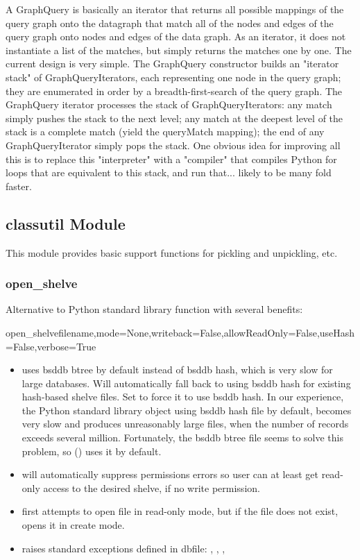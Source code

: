 \documentclass{howto}
\begin{document}
A GraphQuery is basically an iterator that returns all possible mappings of the query graph onto the datagraph that match all of the nodes and edges of the query graph onto nodes and edges of the data graph.  As an iterator, it does not instantiate a list of the matches, but simply returns the matches one by one.  The current design is very simple.  The GraphQuery constructor builds an "iterator stack" of GraphQueryIterators, each representing one node in the query graph; they are enumerated in order by a breadth-first-search of the query graph.  The GraphQuery iterator processes the stack of GraphQueryIterators: any match simply pushes the stack to the next level; any match at the deepest level of the stack is a complete match (yield the queryMatch mapping); the end of any GraphQueryIterator simply pops the stack.  One obvious idea for improving all this is to replace this "interpreter" with a "compiler" that compiles Python for loops that are equivalent to this stack, and run that... likely to be many fold faster.




\subsection{classutil Module}
\label{classutil-module}
This module provides basic support functions for pickling and unpickling,
etc.

\subsubsection{open_shelve}
Alternative to Python standard library function  with several benefits:
\begin{funcdesc}{open_shelve}{filename,mode=None,writeback=False,allowReadOnly=False,useHash=False,verbose=True}
\end{funcdesc}
\begin{itemize}
\item uses bsddb btree by default instead of bsddb hash, which is very slow
for large databases.  Will automatically fall back to using bsddb hash
for existing hash-based shelve files.  Set  to force it to use bsddb hash.
In our experience, the Python standard library  object using
bsddb hash file by default, becomes very slow and produces unreasonably large
files, when the number of records exceeds several million.  Fortunately, the
bsddb btree file seems to solve this problem, so () uses
it by default.
      
\item {} will automatically suppress permissions errors so
user can at least get read-only access to the desired shelve, if no write permission.

\item {} first attempts to open file in read-only mode, but if the file
does not exist, opens it in create mode.

\item raises standard exceptions defined in dbfile: , 
, , 
\end{itemize}
\end{document}
